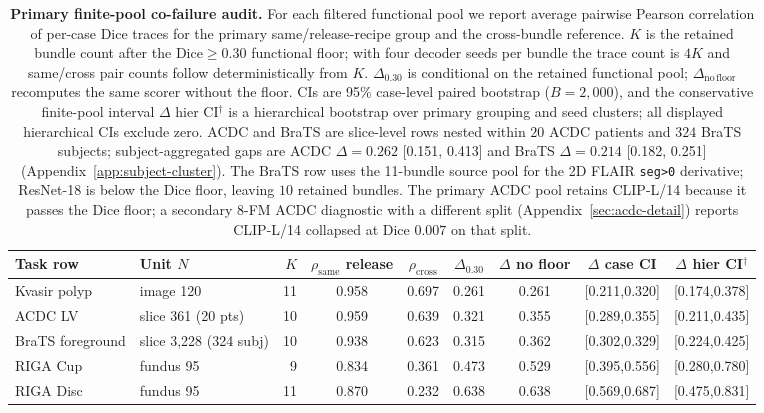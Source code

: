 \documentclass{article}
\begin{document}
\begin{table}[h]
  \caption{\textbf{Primary finite-pool co-failure audit.} For each filtered functional pool we report average pairwise Pearson correlation of per-case Dice traces for the primary same/release-recipe group and the cross-bundle reference. $K$ is the retained bundle count after the Dice${\geq}0.30$ functional floor; with four decoder seeds per bundle the trace count is $4K$ and same/cross pair counts follow deterministically from $K$. $\Delta_{0.30}$ is conditional on the retained functional pool; $\Delta_{\mathrm{no\,floor}}$ recomputes the same scorer without the floor. CIs are 95\% case-level paired bootstrap ($B{=}2{,}000$), and the conservative finite-pool interval $\Delta$ hier CI$^{\dag}$ is a hierarchical bootstrap over primary grouping and seed clusters; all displayed hierarchical CIs exclude zero. ACDC and BraTS are slice-level rows nested within $20$ ACDC patients and $324$ BraTS subjects; subject-aggregated gaps are ACDC $\Delta=0.262$ [0.151, 0.413] and BraTS $\Delta=0.214$ [0.182, 0.251] (Appendix~\ref{app:subject-cluster}). The BraTS row uses the 11-bundle source pool for the 2D FLAIR \texttt{seg>0} derivative; ResNet-18 is below the Dice floor, leaving $10$ retained bundles. The primary ACDC pool retains CLIP-L/14 because it passes the Dice floor; a secondary 8-FM ACDC diagnostic with a different split (Appendix~\ref{sec:acdc-detail}) reports CLIP-L/14 collapsed at Dice $0.007$ on that split.}
  \label{tab:main}
  \centering\footnotesize
  \setlength{\tabcolsep}{3.5pt}
  \begin{tabular*}{\linewidth}{@{\extracolsep{\fill}}llrcccccc}
    \toprule
    Task row & Unit $N$ & $K$ & \makecell[c]{$\rho_{\text{same}}$\\release} & $\rho_{\text{cross}}$ & $\Delta_{0.30}$ & \makecell[c]{$\Delta$\\no floor} & \makecell[c]{$\Delta$\\case CI} & \makecell[c]{$\Delta$ hier\\CI$^{\dag}$} \\
    \midrule
    Kvasir polyp & image 120 & 11 & 0.958 & 0.697 & 0.261 & 0.261 & [0.211,0.320] & [0.174,0.378] \\
    ACDC LV & slice 361 (20 pts) & 10 & 0.959 & 0.639 & 0.321 & 0.355 & [0.289,0.355] & [0.211,0.435] \\
    BraTS foreground & slice 3,228 (324 subj) & 10 & 0.938 & 0.623 & 0.315 & 0.362 & [0.302,0.329] & [0.224,0.425] \\
    RIGA Cup & fundus 95 & 9 & 0.834 & 0.361 & 0.473 & 0.529 & [0.395,0.556] & [0.280,0.780] \\
    RIGA Disc & fundus 95 & 11 & 0.870 & 0.232 & 0.638 & 0.638 & [0.569,0.687] & [0.475,0.831] \\
    \bottomrule
  \end{tabular*}
\end{table}
\end{document}
